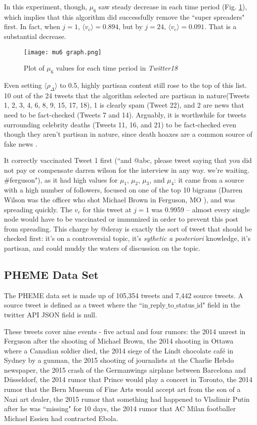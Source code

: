 \documentclass[preprint,review,12pt]{elsarticle}
\begin{document}
In this experiment, though, $\mu_6$ saw steady decrease in each time period (Fig. \ref{fig:mu6 Twitter18}), which implies that this algorithm did successfully remove the ``super spreaders" first. In fact, when $j=1$, $\langle v_c \rangle = 0.894$, but by $j=24$, $\langle v_c \rangle = 0.091$. That is a substantial decrease.
\begin{figure}[h!]
    \centering
    \texttt{[image: mu6 graph.png]}
    \caption{Plot of $\mu_6$ values for each time period in \textit{Twitter18}}
    \label{fig:mu6 Twitter18}
\end{figure}

Even setting $\langle \rho_{\Delta} \rangle$ to 0.5, highly partisan content still rose to the top of this list. 10 out of the 24 tweets that the algorithm selected are partisan in nature(Tweets 1, 2, 3, 4, 6, 8, 9, 15, 17, 18), 1 is clearly spam (Tweet 22), and 2 are news that need to be fact-checked (Tweets 7 and 14). Arguably, it is worthwhile for tweets surrounding celebrity deaths (Tweets 11, 16, and 21) to be fact-checked even though they aren't partisan in nature, since death hoaxes are a common source of fake news \cite{moses2017celebrity}.

It correctly vaccinated Tweet 1 first (``and @abc, please tweet saying that you did not pay or compensate darren wilson for the interview in any way. we're waiting. \#ferguson"), as it had high values for $\mu_1$, $\mu_2$, $\mu_3$, and $\mu_4$: it came from a source with a high number of followers, focused on one of the top 10 bigrams (Darren Wilson was the officer who shot Michael Brown in Ferguson, MO \cite{halpern2015cop}), and was spreading quickly. The $v_c$ for this tweet at $j=1$ was 0.9959 -- almost every single node would have to be vaccinated or immunized in order to prevent this post from spreading. This charge by @deray is exactly the sort of tweet that should be checked first: it's on a controversial topic, it's \textit{sythetic a posteriori} knowledge, it's partisan, and could muddy the waters of discussion on the topic. 

\subsection{PHEME Data Set}
The PHEME data set \cite{kochkina2018pheme} is made up of 105,354 tweets and 7,442 source tweets. A source tweet is defined as a tweet where the ``in$\_$reply$\_$to$\_$status$\_$id" field in the twitter API JSON field is null. 

These tweets cover nine events - five actual and four rumors: the 2014 unrest in Ferguson after the shooting of Michael Brown, the 2014 shooting in Ottawa where a Canadian soldier died, the 2014 siege of the Lindt chocolate caf{\'e} in Sydney by a gunman, the 2015 shooting of journalists at the Charlie Hebdo newspaper, the 2015 crash of the Germanwings airplane between Barcelona and D\"{u}sseldorf, the 2014 rumor that Prince would play a concert in Toronto, the 2014 rumor that the Bern Museum of Fine Arts would accept art from the son of a Nazi art dealer, the 2015 rumor that something had happened to Vladimir Putin after he was ``missing" for 10 days, the 2014 rumor that AC Milan footballer Michael Essien had contracted Ebola.
\end{document}
